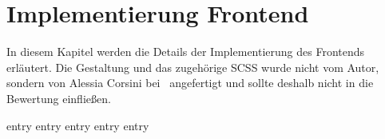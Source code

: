 \chapter{Implementierung Frontend}
\label{chap:implementierung_frontend}

In diesem Kapitel werden die Details der Implementierung des Frontends
erläutert.  Die Gestaltung und das zugehörige SCSS wurde nicht vom Autor,
sondern von Alessia Corsini bei \mesods~angefertigt und sollte deshalb nicht in
die Bewertung einfließen.

{entry}
{entry}
{entry}
{entry}
{entry}
